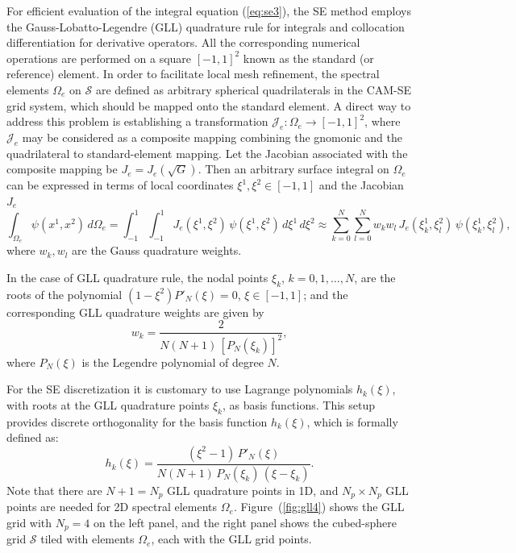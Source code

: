 \documentclass{agujournal}
\begin{document}
 For efficient evaluation of the integral equation (\ref{eq:se3}), the SE  method employs the Gauss-Lobatto-Legendre (GLL) 
  quadrature rule for integrals and collocation differentiation for derivative operators. All the corresponding numerical 
  operations are performed on a square   $[-1,1]^2$ known as  the standard  (or reference) element.   
 In order to facilitate local mesh refinement,   
  the spectral elements  $\Omega_e$  on $\mathcal{S}$ are defined as arbitrary spherical quadrilaterals
  in  the CAM-SE  grid system, which should   be  mapped onto  the standard element.
  A direct  way to address this problem is establishing  %
  a  transformation  $\mathcal{J}_e: \Omega_e \rightarrow [-1,1]^2$, where    $\mathcal{J}_e$
  may be considered as   a  composite mapping combining the gnomonic and  the quadrilateral to standard-element mapping.
  Let the Jacobian  associated  with the composite mapping be $J_e = J_e(\sqrt{G})$.
   Then   an  arbitrary surface integral  on $\Omega_e$ can be expressed in terms of local coordinates $\xi^1, \xi^2 \in [-1, 1] $
 and the Jacobian  $J_e$ 
   \begin{equation}
 \int_{\Omega_e} \psi (x^1,x^2) \,  d\Omega_e =   \int_{-1}^{1} \int_{-1}^{1} J_e(\xi^1,\xi^2)  \,  \psi(\xi^1,\xi^2) \, d\xi^1 \, d\xi^2
   \approx   \sum_{k=0}^{N}   \sum_{l=0}^{N} w_k w_l \, J_e(\xi^1_k,\xi^2_l) \,   \psi(\xi^1_k,\xi^2_l),
                               \label{eq:se4} 
 \end{equation} 
 where  $w_k, w_l$  are  the  Gauss  quadrature weights. 
 
 In the  case of GLL quadrature rule, the  nodal points $\xi_k$, $k=0, 1, \dots, N$, 
 are  the roots of  the polynomial $(1-\xi^2) P'_N(\xi) = 0$,
 $\xi \in [-1,1]$;   and the corresponding  GLL quadrature  weights are given by 
 \[   w_k =  \frac{2}{N(N+1) \, [P_N(\xi_k)]^2 },
 \] 
  where  $P_N(\xi)$ is the  Legendre polynomial of degree $N$. 

   For the SE discretization it is customary to use  Lagrange polynomials  $h_k(\xi)$,   with roots at  the 
 GLL   quadrature points $\xi_k$, as basis functions.  This setup provides  discrete orthogonality 
 for  the basis function $h_k(\xi)$,  which   is formally defined as: 
 \begin{equation}
    h_k(\xi) = \frac{ (\xi^2-1)\, P'_N(\xi)}{ N (N+1)\, P_N(\xi_k) \,(\xi-\xi_k)}.   \label{eq:se5}
 \end{equation}
  Note that there are $N+1 = N_p$ GLL quadrature points in 1D,
 and $N_p \times N_p$ GLL points are needed for 2D spectral elements $\Omega_e$. 
 Figure~(\ref{fig:gll4}) shows the GLL grid  with $N_p =4$ on the left panel, 
 and the right panel shows the cubed-sphere grid $\mathcal{S}$ tiled with elements $\Omega_e$,
 each with the GLL  grid points. 
 
\end{document}
